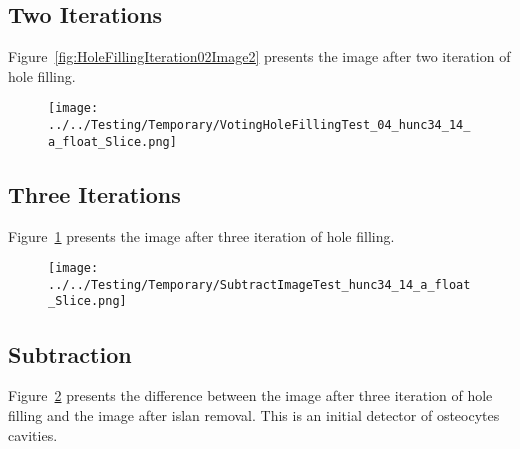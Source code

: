 \documentclass{InsightArticle}
\begin{document}
\subsection{Two Iterations}

Figure~\ref{fig:HoleFillingIteration02Image2} presents the image after two iteration of hole filling.



\clearpage
\begin{figure}
\center
\texttt{[image: ../../Testing/Temporary/VotingHoleFillingTest\_04\_hunc34\_14\_a\_float\_Slice.png]}
\label{fig:HoleFillingIteration03Image3}
\end{figure}

\subsection{Three Iterations}

Figure~\ref{fig:HoleFillingIteration03Image3} presents the image after three iteration of hole filling.


\clearpage
\begin{figure}
\center
\texttt{[image: ../../Testing/Temporary/SubtractImageTest\_hunc34\_14\_a\_float\_Slice.png]}
\label{fig:SubtractionImage02}
\end{figure}

\subsection{Subtraction}

Figure~\ref{fig:SubtractionImage02} presents the difference between the image
after three iteration of hole filling and the image after islan removal. This
is an initial detector of osteocytes cavities.


%
%



\end{document}
